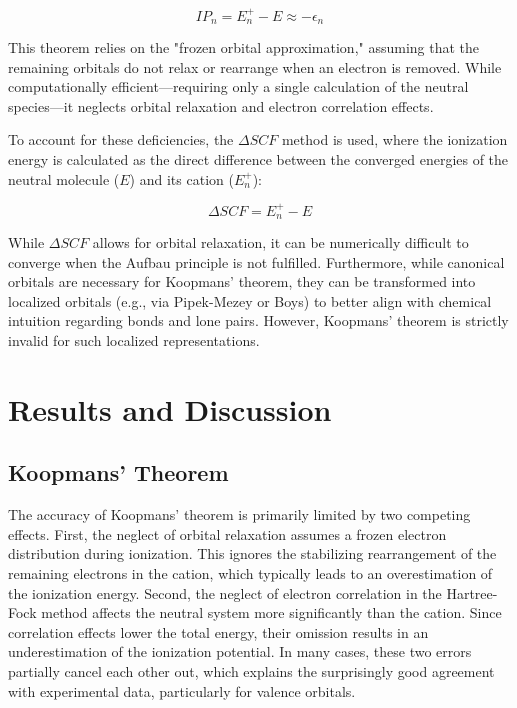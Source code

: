 \documentclass[a4paper,12pt]{scrartcl}
\begin{document}
\begin{equation}
IP_{n} = E_{n}^{+} - E \approx -\epsilon_{n}
\end{equation}

This theorem relies on the "frozen orbital approximation," assuming that the remaining orbitals do not relax or rearrange when an electron is removed. While computationally efficient—requiring only a single calculation of the neutral species—it neglects orbital relaxation and electron correlation effects. 

To account for these deficiencies, the $\Delta SCF$ method is used, where the ionization energy is calculated as the direct difference between the converged energies of the neutral molecule ($E$) and its cation ($E_{n}^{+}$):

\begin{equation}
\Delta SCF = E_{n}^{+} - E
\end{equation}

While $\Delta SCF$ allows for orbital relaxation, it can be numerically difficult to converge when the Aufbau principle is not fulfilled. Furthermore, while canonical orbitals are necessary for Koopmans' theorem, they can be transformed into localized orbitals (e.g., via Pipek-Mezey or Boys) to better align with chemical intuition regarding bonds and lone pairs. However, Koopmans' theorem is strictly invalid for such localized representations.

\section{Results and Discussion}

\subsection{Koopmans’ Theorem}

The accuracy of Koopmans' theorem is primarily limited by two competing effects. First, the neglect of orbital relaxation assumes a frozen electron distribution during ionization. This ignores the stabilizing rearrangement of the remaining electrons in the cation, which typically leads to an overestimation of the ionization energy. Second, the neglect of electron correlation in the Hartree-Fock method affects the neutral system more significantly than the cation. Since correlation effects lower the total energy, their omission results in an underestimation of the ionization potential. In many cases, these two errors partially cancel each other out, which explains the surprisingly good agreement with experimental data, particularly for valence orbitals.
\end{document}
